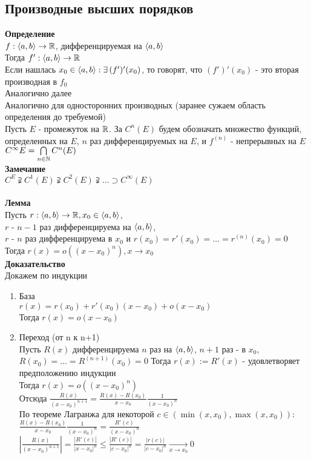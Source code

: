 \documentclass[12pt]{article}
\begin{document}
\subsection{Производные высших порядков}
\textbf{Определение}\\
$f:\langle a,b \rangle \rightarrow \mathbb{R}$, дифференцируемая на $\langle a,b \rangle$\\
Тогда $f':\langle a, b\rangle \rightarrow \mathbb{R}$\\
Если нашлась $x_0\in\langle a,b\rangle: \exists\,(f')'(x_0)$, то говорят, что $(f')'(x_0)$ - это вторая производная в $f_0$\\
Аналогично далее\\
Аналогично для односторонних производных (заранее сужаем область определения до требуемой)\\
Пусть $E$ - промежуток на $\mathbb{R}$. За $C^n(E)$ будем обозначать множество функций, определенных на $E$, $n$ раз дифференцируемых на $E$, и $f^{(n)}$ - непрерывных на $E$\\
$C^\infty E = \bigcap\limits_{n\in \mathbb{N}} C^n(E)$\\
\textbf{Замечание}\\
$C^E \supsetneqq C^1(E) \supsetneqq C^2(E) \supsetneqq \ldots \supset C^\infty(E)$\\\\
\textbf{Лемма}\\
Пусть $r: \langle a,b \rangle \rightarrow \mathbb{R}, x_0 \in \langle a, b \rangle$, \\
$r$ - $n-1$ раз дифференцируема на $\langle a, b \rangle$, \\
$r$ - $n$ раз дифференцируема в $x_0$ и $r(x_0) = r'(x_0) = \ldots = r^{(n)}(x_0) = 0$\\
Тогда $r(x) = o((x-x_0)^n), x \rightarrow x_0$\\
\textbf{Доказательство}\\
Докажем по индукции
\begin{enumerate}
    \item База\\
    $r(x) = r(x_0) + r'(x_0)(x-x_0) + o(x-x_0)$\\
    Тогда $r(x) = o(x-x_0)$
    \item Переход (от n к n+1)\\
    Пусть $R(x)$ дифференцируема $n$ раз на $\langle a, b \rangle$, $n+1$ раз - в $x_0$, $R(x_0) = \ldots = R^{(n+1)} (x_0) = 0$
    Тогда $r(x):= R'(x)$ - удовлетворяет предположению индукции\\
    Тогда $r(x) = o((x-x_0)^n)$\\
    Отсюда $\frac{R(x)}{(x-x_0)^{n+1}} = \frac{R(x)-R(x_0)}{x-x_0} \frac{1}{(x-x_0)^n}$\\
    По теореме Лагранжа для некоторой $c \in (\min(x, x_0), \max(x, x_0))$:\\
    $\frac{R(x)-R(x_0)}{x-x_0} \frac{1}{(x-x_0)^n} = \frac{R'(c)}{(x-x_0)^n}$\\
    $|\frac{R(x)}{(x-x_0)^{n+1}}| = \frac{|R'(c)|}{|x-x_0|^n} \leq \frac{|R'(c)|}{|c-x_0|^n} = \frac{|r(c)|}{|c-x_0|^n} \xrightarrow[x\rightarrow x_0]{} 0$
\end{enumerate}
\end{document}
